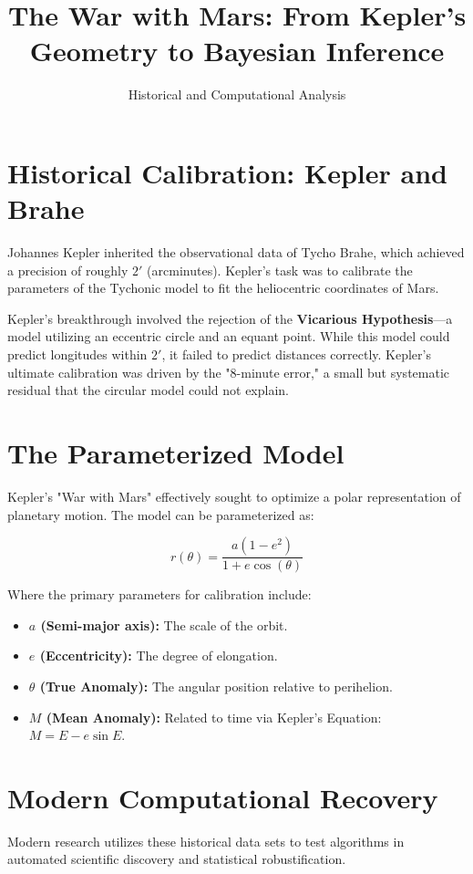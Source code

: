 \documentclass[11pt]{article}
\title{The War with Mars: From Kepler's Geometry to Bayesian Inference}
\author{Historical and Computational Analysis}
\date{}
\begin{document}
\maketitle

\section{Historical Calibration: Kepler and Brahe}
Johannes Kepler inherited the observational data of Tycho Brahe, which achieved a precision of roughly $2'$ (arcminutes). Kepler's task was to calibrate the parameters of the Tychonic model to fit the heliocentric coordinates of Mars. 

Kepler's breakthrough involved the rejection of the \textbf{Vicarious Hypothesis}---a model utilizing an eccentric circle and an equant point. While this model could predict longitudes within $2'$, it failed to predict distances correctly. Kepler’s ultimate calibration was driven by the "8-minute error," a small but systematic residual that the circular model could not explain.

\section{The Parameterized Model}
Kepler's "War with Mars" effectively sought to optimize a polar representation of planetary motion. The model can be parameterized as:

\begin{equation}
r(\theta) = \frac{a(1 - e^2)}{1 + e \cos(\theta)}
\end{equation}

Where the primary parameters for calibration include:
\begin{itemize}
    \item \textbf{$a$ (Semi-major axis):} The scale of the orbit.
    \item \textbf{$e$ (Eccentricity):} The degree of elongation.
    \item \textbf{$\theta$ (True Anomaly):} The angular position relative to perihelion.
    \item \textbf{$M$ (Mean Anomaly):} Related to time via Kepler's Equation: $M = E - e \sin E$.
\end{itemize}

\section{Modern Computational Recovery}
Modern research utilizes these historical data sets to test algorithms in automated scientific discovery and statistical robustification.
\end{document}
